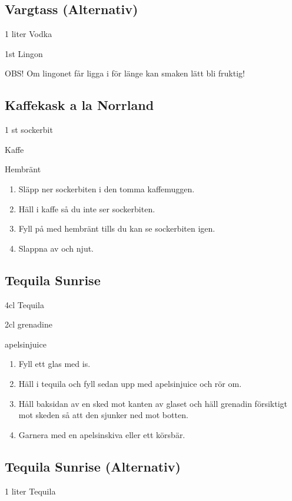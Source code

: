 \subsection*{\textbf{Vargtass (Alternativ)}}

1 liter Vodka

1st Lingon

OBS! Om lingonet får ligga i för länge kan smaken lätt bli fruktig!
\filbreak
\subsection*{\textbf{Kaffekask a la Norrland}}

1 st sockerbit

Kaffe

Hembränt

\begin{enumerate}
    \item Släpp ner sockerbiten i den tomma kaffemuggen. 
    \item Häll i kaffe så du inte ser sockerbiten. 
    \item Fyll på med hembränt tills du kan se sockerbiten igen.
    \item Slappna av och njut.
\end{enumerate}

\subsection*{\textbf{Tequila Sunrise}}

4cl Tequila

2cl grenadine

apelsinjuice

\begin{enumerate}
    \item Fyll ett glas med is.
    \item Häll i tequila och fyll sedan upp med apelsinjuice och rör om.
    \item Håll baksidan av en sked mot kanten av glaset och häll grenadin försiktigt mot skeden så att den sjunker ned mot botten.
    \item Garnera med en apelsinskiva eller ett körsbär.
\end{enumerate}
\filbreak
\subsection*{\textbf{Tequila Sunrise (Alternativ)}}

1 liter Tequila

